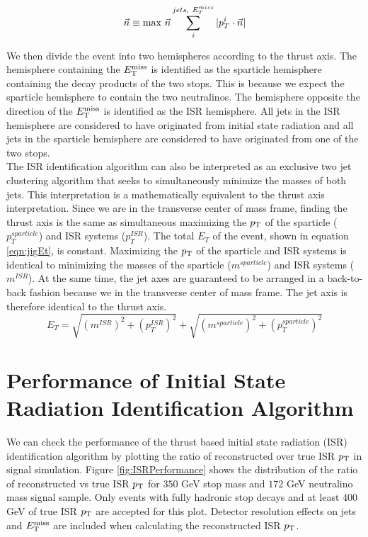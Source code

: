 \begin{equation}
\label{eqn:thrust}
\vec{n} \equiv \max_{}\,{\vec{n}} \sum_i^{jets,~E^{miss}_T} |p_T^i \cdot \vec{n}|
\end{equation}


\indent  We then divide the event into two hemispheres according to the thrust axis.  The hemisphere containing the $E_{\mathrm{T}}^{\mathrm{miss}}$ is identified as the sparticle hemisphere containing the decay products of the two stops.  This is because we expect the sparticle hemisphere to contain the two neutralinos.  The hemisphere opposite the direction of the $E_{\mathrm{T}}^{\mathrm{miss}}$ is identified as the ISR hemisphere.  All jets in the ISR hemisphere are considered to have originated from initial state radiation and all jets in the sparticle hemisphere are considered to have originated from one of the two stops. \\

\indent The ISR identification algorithm can also be interpreted as an exclusive two jet clustering algorithm that seeks to simultaneously minimize the masses of both jets.  This interpretation is a mathematically equivalent to the thrust axis interpretation.  Since we are in the transverse center of mass frame, finding the thrust axis is the same as simultaneous maximizing the $p_{\mathrm{T}}$ of the sparticle ($p^{sparticle}_{T}$) and ISR systems ($p^{ISR}_{T}$).  The total $E_T$ of the event, shown in equation \ref{eqn:jigEt}, is constant.  Maximizing the $p_{\mathrm{T}}$ of the sparticle and ISR systems is identical to minimizing the masses of the sparticle ($m^{sparticle}$) and ISR systems ($m^{ISR}$).  At the same time, the jet axes are guaranteed to be arranged in a back-to-back fashion because we in the transverse center of mass frame.  The jet axis is therefore identical to the thrust axis. \\

\begin{equation}
\label{eqn:jigEt}
E_T = \sqrt{(m^{ISR})^2+(p^{ISR}_{T})^2} + \sqrt{(m^{sparticle})^2+(p^{sparticle}_{T})^2}
\end{equation}

\section{Performance of Initial State Radiation Identification Algorithm}
\label{Jigsaw:Performance}

\indent We can check the performance of the thrust based initial state radiation (ISR) identification algorithm by plotting the ratio of reconstructed over true ISR $p_{\mathrm{T}}$ in signal simulation.  Figure \ref{fig:ISRPerformance} shows the distribution of the ratio of reconstructed vs true ISR $p_{\mathrm{T}}$ for $350$ GeV stop mass and $172$ GeV neutralino mass signal sample.  Only events with fully hadronic stop decays and at least $400$ GeV of true ISR $p_{\mathrm{T}}$ are accepted for this plot.  Detector resolution effects on jets and $E_{\mathrm{T}}^{\mathrm{miss}}$ are included when calculating the reconstructed ISR $p_{\mathrm{T}}$.

